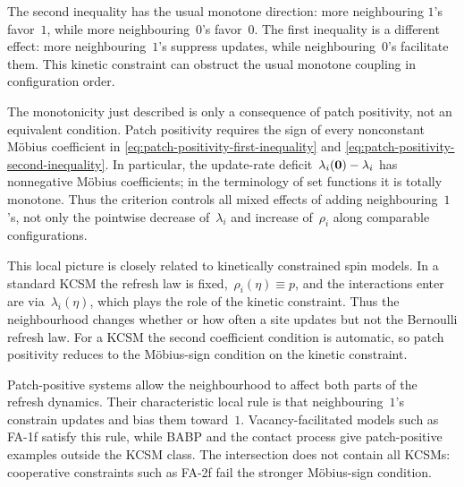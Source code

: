The second inequality has the usual monotone direction: more neighbouring
$1$'s favor~$1$, while more neighbouring~$0$'s favor~$0$. The first inequality
is a different effect: more neighbouring~$1$'s suppress updates, while
neighbouring~$0$'s facilitate them. This kinetic constraint can obstruct the
usual monotone coupling in configuration order.

The monotonicity just described is only a consequence of patch positivity, not
an equivalent condition. Patch positivity requires the sign of every
nonconstant M\"obius coefficient in
\eqref{eq:patch-positivity-first-inequality} and
\eqref{eq:patch-positivity-second-inequality}. In particular, the update-rate
deficit~$\lambda_i(\mathbf{0})-\lambda_i$
has nonnegative M\"obius coefficients; in the terminology of set functions it
is totally monotone. Thus the criterion controls all mixed effects of adding
neighbouring~$1$'s, not only the pointwise decrease of~$\lambda_i$ and increase
of~$\rho_i$ along comparable configurations.

This local picture is closely related to kinetically constrained spin models.
In a standard KCSM the refresh law is fixed,~$\rho_i(\eta)\equiv p$, and the interactions enter are via~$\lambda_i(\eta)$, which plays the role of the kinetic constraint. Thus the
neighbourhood changes whether or how often a site updates but not the Bernoulli
refresh law. For a KCSM the second coefficient condition is automatic, so patch
positivity reduces to the M\"obius-sign condition on the kinetic constraint.

Patch-positive systems allow the neighbourhood to affect both parts of the
refresh dynamics. Their characteristic local rule is that neighbouring~$1$'s
constrain updates and bias them toward~$1$. Vacancy-facilitated models such as
FA-1f satisfy this rule, while BABP and the contact process give patch-positive
examples outside the KCSM class. The intersection does not contain all KCSMs:
cooperative constraints such as FA-2f fail the stronger M\"obius-sign condition.
